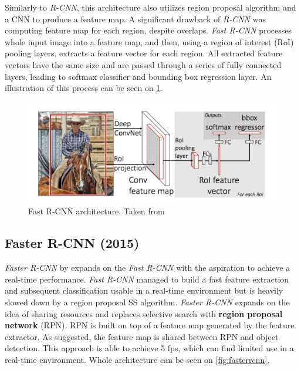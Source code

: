 Similarly to \textit{R-CNN}, this architecture also utilizes region proposal algorithm and a CNN to produce a feature map. A significant drawback of \textit{R-CNN} was computing feature map for each region, despite overlaps. \textit{Fast R-CNN} processes whole input image into a feature map, and then, using a region of interest (RoI) pooling layers, extracts a feature vector for each region. All extracted feature vectors have the same size and are passed through a series of fully connected layers, leading to softmax classifier and bounding box regression layer. An illustration of this process can be seen on \cref{fig:fastrcnn}.

\begin{figure}
    \centering
    \includegraphics[width=\textwidth]{img/fastrcnn}
    \caption{Fast R-CNN architecture. Taken from \cite[fig. 1]{bib:fastrcnn}}
    \label{fig:fastrcnn}
\end{figure}

\subsection{Faster R-CNN (2015)}
 
 \textit{Faster R-CNN} by \citeauthor{bib:fasterrcnn} \cite{bib:fasterrcnn} expands on the \textit{Fast R-CNN} with the aspiration to achieve a real-time performance. \textit{Fast R-CNN} managed to build a fast feature extraction and subsequent classification usable in a real-time environment but is heavily slowed down by a region proposal SS algorithm. \textit{Faster R-CNN} expands on the idea of sharing resources and replaces selective search with \textbf{region proposal network} (RPN). RPN is built on top of a feature map generated by the feature extractor. As suggested, the feature map is shared between RPN and object detection. This approach is able to achieve 5 fps, which can find limited use in a real-time environment. Whole architecture can be seen on \cref{fig:fasterrcnn}. 
 
